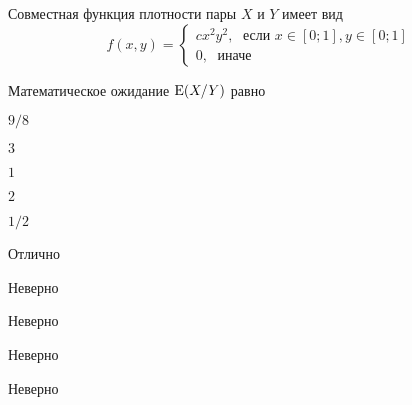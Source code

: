 
\begin{question}
Совместная функция плотности пары \(X\) и \(Y\) имеет вид \[
f(x,y)=\begin{cases}
cx^2y^2, \; \text{ если } x\in[0;1], y\in [0;1] \\
0, \; \text{ иначе}
\end{cases}
\]

\vspace{0.5cm}

Математическое ожидание \(\operatorname{E}(X/Y)\) равно
\begin{answerlist}
  \item \(9/8\)
  \item \(3\)
  \item \(1\)
  \item \(2\)
  \item \(1/2\)
\end{answerlist}
\end{question}

\begin{solution}
\begin{answerlist}
  \item Отлично
  \item Неверно
  \item Неверно
  \item Неверно
  \item Неверно
\end{answerlist}
\end{solution}

